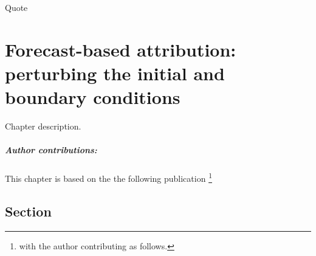 \begin{savequote}[8cm]
    Quote
\end{savequote}
    
\chapter{\label{ch4}Forecast-based attribution: perturbing the initial and boundary conditions}

Chapter description.
\small\paragraph{Author contributions:} This chapter is based on the the following publication \footnote{with the author contributing as follows.} \par\vspace{1em}

\clearpage

\minitoc

\clearpage

\section{Section}

    \blindtext